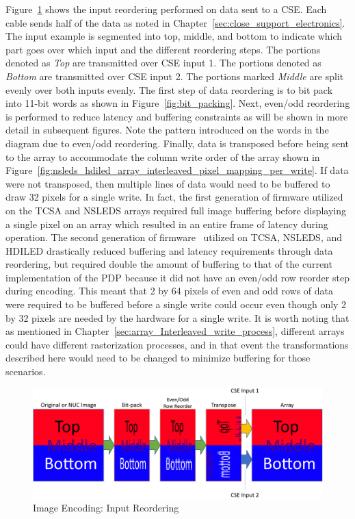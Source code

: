     Figure~\ref{fig:image_encoding} shows the input reordering performed on data sent to a CSE. Each cable sends half of the data as noted in Chapter~\ref{sec:close_support_electronics}. The input example is segmented into top, middle, and bottom to indicate which part goes over which input and the different reordering steps. The portions denoted as {\it Top} are transmitted over CSE input 1. The portions denoted as {\it Bottom} are transmitted over CSE input 2. The portions marked {\it Middle} are split evenly over both inputs evenly. The first step of data reordering is to bit pack into 11-bit words as shown in Figure~\ref{fig:bit_packing}. Next, even/odd reordering is performed to reduce latency and buffering constraints as will be shown in more detail in subsequent figures. Note the pattern introduced on the words in the diagram due to even/odd reordering. Finally, data is transposed before being sent to the array to accommodate the column write order of the array shown in Figure~\ref{fig:nsleds_hdiled_array_interleaved_pixel_mapping_per_write}. If data were not transposed, then multiple lines of data would need to be buffered to draw 32 pixels for a single write. In fact, the first generation of firmware utilized on the TCSA and NSLEDS arrays required full image buffering before displaying a single pixel on an array which resulted in an entire frame of latency during operation. The second generation of firmware~\cite{HouserEtAl2018} utilized on TCSA, NSLEDS, and HDILED drastically reduced buffering and latency requirements through data reordering, but
    required double the amount of buffering to that of the current implementation of the PDP because it did not have an even/odd row reorder step during encoding. This meant that 2 by 64 pixels of even and odd rows of data were required to be buffered before a single write could occur even though only 2 by 32 pixels are needed by the hardware for a single write. It is worth noting that as mentioned in Chapter~\ref{sec:array_Interleaved_write_process}, different arrays could have different rasterization processes, and in that event the transformations described here would need to be changed to minimize buffering for those scenarios.

    \begin{figure}
        \centering
        \includegraphics[width=1.0\textwidth]{fig/image_encoding.pdf}
        \caption{Image Encoding: Input Reordering}
        \label{fig:image_encoding}
    \end{figure}

